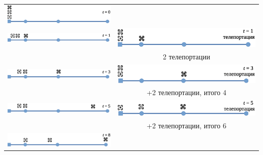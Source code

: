 \begin{center}
\begin{tabular}{cc}
\includegraphics[scale=0.5]{sample-3-01.eps}\\[0.5cm]
\includegraphics[scale=0.5]{sample-3-02.eps}&
\includegraphics[scale=0.5]{sample-3-03.eps}\\
&2 телепортации\\[0.5cm]
\includegraphics[scale=0.5]{sample-3-04.eps}&
\includegraphics[scale=0.5]{sample-3-05.eps}\\
&+2 телепортации, итого 4\\[0.5cm]
\includegraphics[scale=0.5]{sample-3-06.eps}&
\includegraphics[scale=0.5]{sample-3-07.eps}\\
&+2 телепортации, итого 6\\[0.5cm]
\includegraphics[scale=0.5]{sample-3-08.eps}&

\end{tabular}
\end{center}

